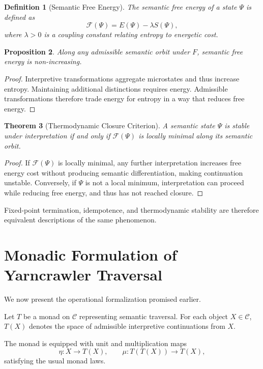 \documentclass[12pt]{article}
\newtheorem{theorem}{Theorem}[section]
\newtheorem{definition}[theorem]{Definition}
\newtheorem{proposition}[theorem]{Proposition}
\theoremstyle{remark}
\begin{document}
\begin{definition}[Semantic Free Energy]
The semantic free energy of a state $\Psi$ is defined as
\[
\mathcal{F}(\Psi) = E(\Psi) - \lambda S(\Psi),
\]
where $\lambda > 0$ is a coupling constant relating entropy to energetic cost.
\end{definition}

\begin{proposition}
Along any admissible semantic orbit under $F$, semantic free energy is non-increasing.
\end{proposition}

\begin{proof}
Interpretive transformations aggregate microstates and thus increase entropy. Maintaining additional distinctions requires energy. Admissible transformations therefore trade energy for entropy in a way that reduces free energy.
\end{proof}

\begin{theorem}[Thermodynamic Closure Criterion]
A semantic state $\Psi$ is stable under interpretation if and only if $\mathcal{F}(\Psi)$ is locally minimal along its semantic orbit.
\end{theorem}

\begin{proof}
If $\mathcal{F}(\Psi)$ is locally minimal, any further interpretation increases free energy cost without producing semantic differentiation, making continuation unstable. Conversely, if $\Psi$ is not a local minimum, interpretation can proceed while reducing free energy, and thus has not reached closure.
\end{proof}

Fixed-point termination, idempotence, and thermodynamic stability are therefore equivalent descriptions of the same phenomenon.

\section{Monadic Formulation of Yarncrawler Traversal}

We now present the operational formalization promised earlier.

Let $T$ be a monad on $\mathcal{C}$ representing semantic traversal. For each object $X \in \mathcal{C}$, $T(X)$ denotes the space of admissible interpretive continuations from $X$.

The monad is equipped with unit and multiplication maps
\[
\eta : X \to T(X), \qquad \mu : T(T(X)) \to T(X),
\]
satisfying the usual monad laws.
\end{document}
